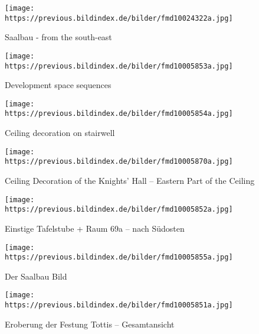 \documentclass[
  a4paper,
]{book}
\begin{document}
\begin{figure*}
\begin{figure}[H]    
  \texttt{[image: https://previous.bildindex.de/bilder/fmd10024322a.jpg]}
  \caption{Saalbau - from the south-east}
  \label{fig:{https://previous.bildindex.de/bilder/fmd10024322a.jpg}}
\end{figure}

\clearpage

\begin{figure}[H]    
  \texttt{[image: https://previous.bildindex.de/bilder/fmd10005853a.jpg]}
  \caption{Development space sequences}
  \label{fig:{https://previous.bildindex.de/bilder/fmd10005853a.jpg}}
\end{figure}

\clearpage

\begin{figure}[H]    
  \texttt{[image: https://previous.bildindex.de/bilder/fmd10005854a.jpg]}
  \caption{Ceiling decoration on stairwell}
  \label{fig:{https://previous.bildindex.de/bilder/fmd10005854a.jpg}}
\end{figure}

\clearpage

\begin{figure}[H]    
  \texttt{[image: https://previous.bildindex.de/bilder/fmd10005870a.jpg]}
  \caption{Ceiling Decoration of the Knights' Hall – Eastern Part of the Ceiling}
  \label{fig:{https://previous.bildindex.de/bilder/fmd10005870a.jpg}}
\end{figure}

\clearpage

\begin{figure}[H]    
  \texttt{[image: https://previous.bildindex.de/bilder/fmd10005852a.jpg]}
  \caption{Einstige Tafelstube + Raum 69a – nach Südosten}
  \label{fig:{https://previous.bildindex.de/bilder/fmd10005852a.jpg}}
\end{figure}

\clearpage

\begin{figure}[H]    
  \texttt{[image: https://previous.bildindex.de/bilder/fmd10005855a.jpg]}
  \caption{Der Saalbau Bild}
  \label{fig:{https://previous.bildindex.de/bilder/fmd10005855a.jpg}}
\end{figure}

\clearpage

\begin{figure}[H]    
  \texttt{[image: https://previous.bildindex.de/bilder/fmd10005851a.jpg]}
  \caption{Eroberung der Festung Tottis – Gesamtansicht}
  \label{fig:{https://previous.bildindex.de/bilder/fmd10005851a.jpg}}
\end{figure}


\end{figure*}
\end{document}
